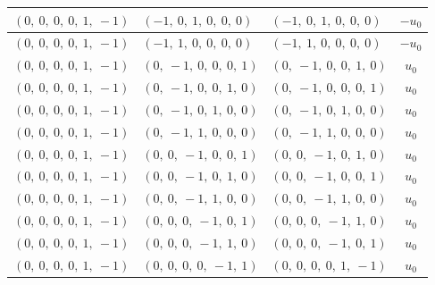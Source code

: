 \documentclass[11pt]{article}
\theoremstyle{definition}
\begin{document}
\begin{longtable}{|l|l|l|c|}
    \hline
    $\left( 0, \  0, \  0, \  0, \  1, \  -1\right)$ & $\left( -1, \  0, \  1, \  0, \  0, \  0\right)$ & $\left( -1, \  0, \  1, \  0, \  0, \  0\right)$ & $- u_{0}$ \\
    \hline
    $\left( 0, \  0, \  0, \  0, \  1, \  -1\right)$ & $\left( -1, \  1, \  0, \  0, \  0, \  0\right)$ & $\left( -1, \  1, \  0, \  0, \  0, \  0\right)$ & $- u_{0}$ \\
    \hline
    $\left( 0, \  0, \  0, \  0, \  1, \  -1\right)$ & $\left( 0, \  -1, \  0, \  0, \  0, \  1\right)$ & $\left( 0, \  -1, \  0, \  0, \  1, \  0\right)$ & $u_{0}$ \\
    \hline
    $\left( 0, \  0, \  0, \  0, \  1, \  -1\right)$ & $\left( 0, \  -1, \  0, \  0, \  1, \  0\right)$ & $\left( 0, \  -1, \  0, \  0, \  0, \  1\right)$ & $u_{0}$ \\
    \hline
    $\left( 0, \  0, \  0, \  0, \  1, \  -1\right)$ & $\left( 0, \  -1, \  0, \  1, \  0, \  0\right)$ & $\left( 0, \  -1, \  0, \  1, \  0, \  0\right)$ & $u_{0}$ \\
    \hline
    $\left( 0, \  0, \  0, \  0, \  1, \  -1\right)$ & $\left( 0, \  -1, \  1, \  0, \  0, \  0\right)$ & $\left( 0, \  -1, \  1, \  0, \  0, \  0\right)$ & $u_{0}$ \\
    \hline
    $\left( 0, \  0, \  0, \  0, \  1, \  -1\right)$ & $\left( 0, \  0, \  -1, \  0, \  0, \  1\right)$ & $\left( 0, \  0, \  -1, \  0, \  1, \  0\right)$ & $u_{0}$ \\
    \hline
    $\left( 0, \  0, \  0, \  0, \  1, \  -1\right)$ & $\left( 0, \  0, \  -1, \  0, \  1, \  0\right)$ & $\left( 0, \  0, \  -1, \  0, \  0, \  1\right)$ & $u_{0}$ \\
    \hline
    $\left( 0, \  0, \  0, \  0, \  1, \  -1\right)$ & $\left( 0, \  0, \  -1, \  1, \  0, \  0\right)$ & $\left( 0, \  0, \  -1, \  1, \  0, \  0\right)$ & $u_{0}$ \\
    \hline
    $\left( 0, \  0, \  0, \  0, \  1, \  -1\right)$ & $\left( 0, \  0, \  0, \  -1, \  0, \  1\right)$ & $\left( 0, \  0, \  0, \  -1, \  1, \  0\right)$ & $u_{0}$ \\
    \hline
    $\left( 0, \  0, \  0, \  0, \  1, \  -1\right)$ & $\left( 0, \  0, \  0, \  -1, \  1, \  0\right)$ & $\left( 0, \  0, \  0, \  -1, \  0, \  1\right)$ & $u_{0}$ \\
    \hline
    $\left( 0, \  0, \  0, \  0, \  1, \  -1\right)$ & $\left( 0, \  0, \  0, \  0, \  -1, \  1\right)$ & $\left( 0, \  0, \  0, \  0, \  1, \  -1\right)$ & $u_{0}$ \\

\end{longtable}
\end{document}
